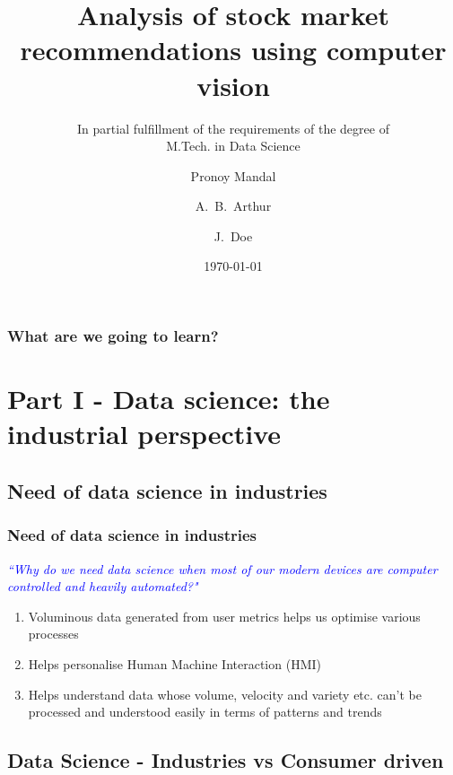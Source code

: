 \documentclass[9pt]{beamer}
\title{Analysis of stock market recommendations using computer vision}
\subtitle{\scriptsize{In partial fulfillment of the requirements of the degree of \\ M.Tech. in Data Science}}
\author[Pronoy Mandal (Reg.no.: 20-27-09)]{\large Pronoy Mandal} \\
\author[Arthur, Doe] %
{A.~B.~Arthur\inst{1} \and J.~Doe\inst{2}}
\institute[VFU] %
{
  \inst{1}%
  Faculty of Physics\\
  Very Famous University
  \and
  \inst{2}%
  Faculty of Chemistry\\
  Very Famous University
}
\date{\today}
\begin{document}
\begin{frame}[plain]
 \titlepage
\end{frame}

\begin{frame}
\frametitle{What are we going to learn?}
\tableofcontents
\end{frame}

\section{Part I - Data science: the industrial perspective}

\subsection{Need of data science in industries}

\begin{frame}
 \frametitle{Need of data science in industries}
 \textit{\textcolor{blue}{``Why do we need data science when most of our modern devices are computer controlled and heavily automated?"}} \\

 \begin{enumerate}
    \item<2-> Voluminous data generated from user metrics helps us optimise various processes
    \item<2-> Helps personalise Human Machine Interaction (HMI)
    \item<2-> Helps understand data whose volume, velocity and variety etc. can't be processed and understood easily in terms of patterns and trends

 \end{enumerate}
\end{frame}

\subsection{Data Science - Industries vs Consumer driven}
\end{document}
